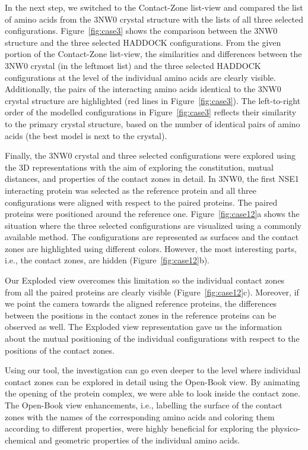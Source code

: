 \documentclass[twocolumn]{bmcart}%
\def\OpBook {Open-Book view\xspace}
\def\ExpView {Exploded view\xspace}
\def\CoZoListView {Contact-Zone list-view\xspace}
\begin{document}
In the next step, we switched to the \CoZoListView and compared the list of amino acids from the 3NW0 crystal structure with the lists of all three selected configurations.
Figure~\ref{fig:case3} shows the comparison between the 3NW0 structure and the three selected HADDOCK configurations.
From the given portion of the \CoZoListView, the similarities and differences between the 3NW0 crystal (in the leftmost list) and the three selected HADDOCK configurations at the level of the individual amino acids are clearly visible.
Additionally, the pairs of the interacting amino acids identical to the 3NW0 crystal structure are highlighted (red lines in Figure~\ref{fig:case3}). 
The left-to-right order of the modelled configurations in Figure~\ref{fig:case3} reflects their similarity to the primary crystal structure, based on the number of identical pairs of amino acids (the best model is next to the crystal).

Finally, the 3NW0 crystal and three selected configurations were explored using the 3D representations with the aim of exploring the constitution, mutual distances, and properties of the contact zones in detail.
In 3NW0, the first NSE1 interacting protein was selected as the reference protein and all three configurations were aligned with respect to the paired proteins.
The paired proteins were positioned around the reference one.
Figure~\ref{fig:case12}a shows the situation where the three selected configurations are visualized using a commonly available method.
The configurations are represented as surfaces and the contact zones are highlighted using different colors.
However, the most interesting parts, i.e., the contact zones, are hidden (Figure~\ref{fig:case12}b).

Our \ExpView overcomes this limitation so the individual contact zones from all the paired proteins are clearly visible (Figure~\ref{fig:case12}c).
Moreover, if we point the camera towards the aligned reference proteins, the differences between the positions in the contact zones in the reference proteins can be observed as well.
The \ExpView representation gave us the information about the mutual positioning of the individual configurations with respect to the positions of the contact zones.

Using our tool, the investigation can go even deeper to the level where individual contact zones can be explored in detail using the \OpBook.
By animating the opening of the protein complex, we were able to look inside the contact zone.
The \OpBook enhancements, i.e., labelling the surface of the contact zones with the names of the corresponding amino acids and coloring them according to different properties, were highly beneficial for exploring the physico-chemical and geometric properties of the individual amino acids.
\end{document}
